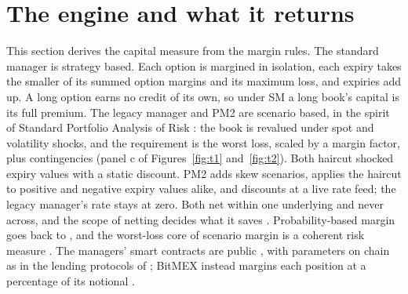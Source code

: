 \documentclass[a4paper,fleqn]{cas-dc}
\begin{document}
\section{The engine and what it returns}\label{sec:engine}
This section derives the capital measure from the margin rules. The standard manager is strategy based. Each
option is margined in isolation, each expiry takes the smaller of its summed option margins and its maximum loss,
and expiries add up. A long option earns no credit of its own, so under SM a long book's capital is its full
premium. The legacy manager and PM2 are scenario based, in the spirit of Standard Portfolio Analysis of Risk
\citep{kupiec1994}: the book is revalued under spot and volatility shocks, and the requirement is the worst loss,
scaled by a margin factor, plus contingencies (panel c of Figures~\ref{fig:t1} and~\ref{fig:t2}). Both haircut
shocked expiry values with a static discount. PM2 adds skew scenarios, applies the haircut to positive and
negative expiry values alike, and discounts at a live rate feed; the legacy manager's rate stays at zero. Both net
within one underlying and never across, and the scope of netting decides what it saves
\citep{duffie2011,cont2014}. Probability-based margin goes back to \citet{figlewski1984}, and the worst-loss core
of scenario margin is a coherent risk measure \citep{artzner1999}. The managers' smart contracts are public
\citep{derivev2core}, with parameters on chain as in the lending protocols of \citet{qin2021}; BitMEX instead
margins each position at a percentage of its notional \citep{soska2021}.
\end{document}
